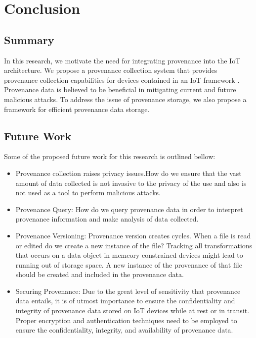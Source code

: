 
\chapter{Conclusion}

\section{Summary}
In this research, we motivate the need for integrating provenance into the IoT architecture. We propose a provenance collection system that provides provenance collection capabilities for devices contained in an IoT framework . Provenance data is believed to be beneficial in mitigating current and future malicious attacks. To address the issue of provenance storage, we also propose a framework for efficient provenance data storage.

\section{Future Work}

Some of the proposed future work for this research is outlined bellow:
\begin{itemize}

\item Provenance collection raises privacy issues.How do we ensure that the vast amount of data collected is not invasive to the privacy of the use and also is not used as a tool to perform malicious attacks.

\item Provenance Query: How do we query provenance data in order to interpret provenance information and make analysis of data collected.

\item Provenance Versioning: Provenance version creates cycles. When a file is read or edited do we create a new instance of the file? Tracking all transformations that occurs on a data object in memeory constrained devices might lead to running out of storage space. A new instance of the provenance of that file should be created and included in the provenance data.

\item Securing Provenance: Due to the great level of sensitivity that  provenance data entails, it is of utmost importance to ensure the confidentiality and integrity of provenance data stored on IoT devices while at rest or in transit. Proper encryption and authentication techniques \cite{Hasan:2009:CFP:1525908.1525909} need to be employed to ensure the confidentiality, integrity, and availability of provenance data.

\end{itemize}

